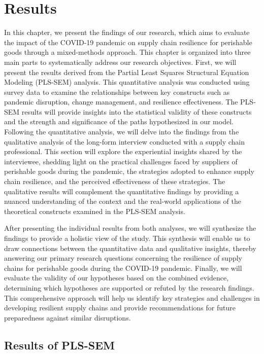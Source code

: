 \chapter{Results}

In this chapter, we present the findings of our research, which aims to evaluate the impact of the COVID-19 pandemic on supply chain resilience for perishable goods through a mixed-methods approach. This chapter is organized into three main parts to systematically address our research objectives. First, we will present the results derived from the Partial Least Squares Structural Equation Modeling (PLS-SEM) analysis. This quantitative analysis was conducted using survey data to examine the relationships between key constructs such as pandemic disruption, change management, and resilience effectiveness. The PLS-SEM results will provide insights into the statistical validity of these constructs and the strength and significance of the paths hypothesized in our model. Following the quantitative analysis, we will delve into the findings from the qualitative analysis of the long-form interview conducted with a supply chain professional. This section will explore the experiential insights shared by the interviewee, shedding light on the practical challenges faced by suppliers of perishable goods during the pandemic, the strategies adopted to enhance supply chain resilience, and the perceived effectiveness of these strategies. The qualitative results will complement the quantitative findings by providing a nuanced understanding of the context and the real-world applications of the theoretical constructs examined in the PLS-SEM analysis.

After presenting the individual results from both analyses, we will synthesize the findings to provide a holistic view of the study. This synthesis will enable us to draw connections between the quantitative data and qualitative insights, thereby answering our primary research questions concerning the resilience of supply chains for perishable goods during the COVID-19 pandemic. Finally, we will evaluate the validity of our hypotheses based on the combined evidence, determining which hypotheses are supported or refuted by the research findings. This comprehensive approach will help us identify key strategies and challenges in developing resilient supply chains and provide recommendations for future preparedness against similar disruptions.

\section{Results of PLS-SEM}

